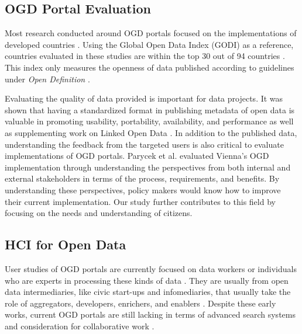 \documentclass{sigchi}
\begin{document}
\subsection{OGD Portal Evaluation}
Most research conducted around OGD portals focused on the implementations of developed countries \cite{kacprzak2019characterising, klimek2019dcat, Koesten2019,Parycek2014}. Using the Global Open Data Index (GODI) as a reference, countries evaluated in these studies are within the top 30 out of 94 countries \cite{godimetric2016}. This index only measures the openness of data published according to guidelines under \textit{Open Definition} \cite{godimetric2016}.

Evaluating the quality of data provided is important for data projects. It was shown that having a standardized format in publishing metadata of open data is valuable in promoting usability, portability, availability, and performance as well as supplementing work on Linked Open Data \cite{klimek2019dcat}. In addition to the published data, understanding the feedback from the targeted users is also critical to evaluate implementations of OGD portals. Parycek et al. \cite{Parycek2014} evaluated Vienna's OGD implementation through understanding the perspectives from both internal and external stakeholders in terms of the process, requirements, and benefits. By understanding these perspectives, policy makers would know how to improve their current implementation. Our study further contributes to this field by focusing on the needs and understanding of citizens.

\subsection{HCI for Open Data}
User studies of OGD portals are currently focused on data workers or individuals who are experts in processing these kinds of data \cite{Choi2017, Erete2016, kacprzak2019characterising, Koesten2019, Koesten2017}. They are usually from open data intermediaries, like civic start-ups and infomediaries, that usually take the role of aggregators, developers, enrichers, and enablers \cite{VanSchalkwyk2015}. Despite these early works, current OGD portals are still lacking in terms of advanced search systems \cite{kacprzak2019characterising, Koesten2017} and consideration for collaborative work \cite{Choi2017, Erete2016, Koesten2019}.
\end{document}
